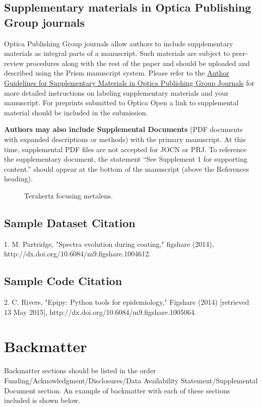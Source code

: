 \documentclass[9pt,twocolumn,twoside]{opticajnl}
\begin{document}
\subsection{Supplementary materials in Optica Publishing Group journals}
Optica Publishing Group journals allow authors to include supplementary materials as integral parts of a manuscript. Such materials are subject to peer-review procedures along with the rest of the paper and should be uploaded and described using the Prism manuscript system. Please refer to the \href{https://opg.optica.org/submit/style/supplementary_materials.cfm}{Author Guidelines for Supplementary Materials in Optica Publishing Group Journals} for more detailed instructions on labeling supplementary materials and your manuscript. For preprints submitted to Optica Open a link to supplemental material should be included in the submission.

\textbf{Authors may also include Supplemental Documents} (PDF documents with expanded descriptions or methods) with the primary manuscript. At this time, supplemental PDF files are not accepted for JOCN or PRJ. To reference the supplementary document, the statement ``See Supplement 1 for supporting content.'' should appear at the bottom of the manuscript (above the References heading). 

\begin{figure}[ht!]
\caption{Terahertz focusing metalens.}
\end{figure}


\subsection{Sample Dataset Citation}

1. M. Partridge, "Spectra evolution during coating," figshare (2014), http://dx.doi.org/10.6084/m9.figshare.1004612.

\subsection{Sample Code Citation}

2. C. Rivers, "Epipy: Python tools for epidemiology," Figshare (2014) [retrieved 13 May 2015], http://dx.doi.org/10.6084/m9.figshare.1005064.

\section{Backmatter}
Backmatter sections should be listed in the order Funding/Acknowledgment/Disclosures/Data Availability Statement/Supplemental Document section. An example of backmatter with each of these sections included is shown below.
\end{document}
